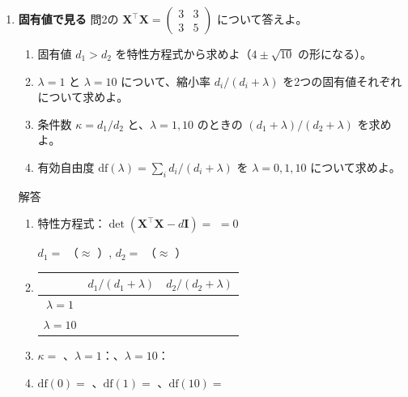 \documentclass[a4paper,dvipdfmx]{jsarticle}
\newcommand{\提出期限}{2026年11月2日（月）}
\newcommand{\学籍番号}{0000000}
\newcommand{\氏名}{氏名を書く}
\newcommand{\提出日}{2026年11月2日}
\newenvironment{answer}{\begin{itembox}[l]{解答}}{\end{itembox}}
\begin{document}
\begin{enumerate}
\begin{answer}
\begin{enumerate}
          式(6.7)からの説明：
          \vspace{10mm}
      \end{enumerate}
    \end{answer}

  \item \textbf{固有値で見る}\quad
    問2の $\bm{X}^\top\bm{X} = \begin{pmatrix} 3 & 3 \\ 3 & 5 \end{pmatrix}$ について答えよ。
    \begin{enumerate}
      \item 固有値 $d_1 > d_2$ を特性方程式から求めよ（$4 \pm \sqrt{10}$ の形になる）。
      \item $\lambda = 1$ と $\lambda = 10$ について、縮小率 $d_i/(d_i + \lambda)$ を2つの固有値それぞれについて求めよ。
      \item 条件数 $\kappa = d_1/d_2$ と、$\lambda = 1, 10$ のときの $(d_1 + \lambda)/(d_2 + \lambda)$ を求めよ。
      \item 有効自由度 $\mathrm{df}(\lambda) = \sum_i d_i/(d_i + \lambda)$ を $\lambda = 0, 1, 10$ について求めよ。
    \end{enumerate}
    \begin{answer}
      \begin{enumerate}
        \item 特性方程式：$\det(\bm{X}^\top\bm{X} - d\bm{I}) = $ \phantom{XXXXXXXXXXXX} $= 0$
          \vspace{2mm}

          $d_1 = $ \phantom{XXXXXX}（$\approx$ \phantom{XXXX}）, \quad $d_2 = $ \phantom{XXXXXX}（$\approx$ \phantom{XXXX}）
        \item
          \begin{center}
            \begin{tabular}{c|c|c}
              & $d_1/(d_1 + \lambda)$ & $d_2/(d_2 + \lambda)$ \\ \hline
              $\lambda = 1$ & \phantom{XXXXXX} & \phantom{XXXXXX} \\
              $\lambda = 10$ & \phantom{XXXXXX} & \phantom{XXXXXX}
            \end{tabular}
          \end{center}
        \item $\kappa = $ \phantom{XXXXXX}、$\lambda = 1$：\phantom{XXXXXX}、$\lambda = 10$：\phantom{XXXXXX}
          \vspace{2mm}
        \item $\mathrm{df}(0) = $ \phantom{XXXX}、$\mathrm{df}(1) = $ \phantom{XXXX}、$\mathrm{df}(10) = $ \phantom{XXXX}
          \vspace{2mm}
      \end{enumerate}
    \end{answer}


\end{enumerate}
\end{document}
